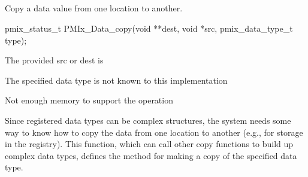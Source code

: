 \subsection{}

\summary

Copy a data value from one location to another.

\format

\cspecificstart
\begin{codepar}
pmix_status_t
PMIx_Data_copy(void **dest, void *src,
               pmix_data_type_t type);
\end{codepar}
\cspecificend

\begin{arglist}
\end{arglist}

\returnstart
\begin{constantdesc}
\item {} The provided src or dest is 
\item {} The specified data type is not known to this implementation
\item {} Not enough memory to support the operation
\end{constantdesc}
\returnend

\descr

Since registered data types can be complex structures, the system needs some way to know how to copy the data from one location to another (e.g., for storage in the registry). This function, which can call other copy functions to build up complex data types, defines the method for making a copy of the specified data type.


\subsection{}

\summary

